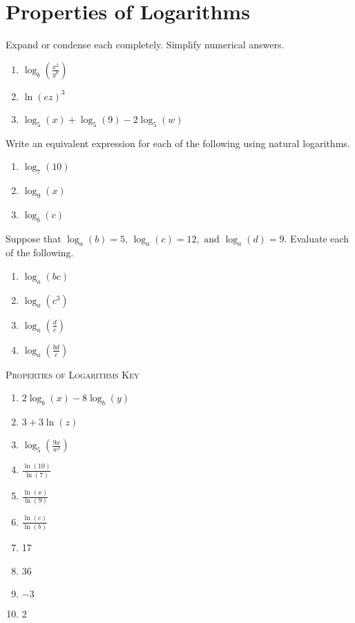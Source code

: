 \chapter{Properties of Logarithms}

Expand or condense each completely. Simplify numerical answers.
\begin{enumerate}
	\item $\log_b\left(\frac{x^2}{y^8}\right)$
	\item $\ln\left(ez\right)^3$
	\item $\log_5(x) + \log_5(9) - 2\log_5(w)$
\setcounter{Review}{\value{enumi}}
\end{enumerate}

Write an equivalent expression for each of the following using natural logarithms.
\begin{enumerate}
\setcounter{enumi}{\value{Review}}
	\item $\log_7(10)$
	\item $\log_9(x)$
	\item $\log_b(c)$
\setcounter{Review}{\value{enumi}}
\end{enumerate}

Suppose that $\log_a(b) = 5, \, \log_a(c) = 12, \text{ and } \log_a(d) = 9$. Evaluate each of the following.
\begin{enumerate}	\setcounter{enumi}{\value{Review}}
	\item $\log_a(bc)$
    \item $\log_a(c^3)$
    \item $\log_a\left(\frac{d}{c}\right)$
    \item $\log_a\left(\frac{bd}{c}\right)$
\end{enumerate}
\setcounter{Review}{\value{enumi}}

\newpage

\textsc{Properties of Logarithms Key}

\begin{enumerate}
	\item $2\log_b(x) - 8\log_b(y)$
    \item $3 + 3\ln(z)$
    \item $\log_5\left(\frac{9x}{w^2}\right)$
    \item $\frac{\ln(10)}{\ln(7)}$
    \item $\frac{\ln(x)}{\ln(9)}$
    \item $\frac{\ln(c)}{\ln(b)}$
    \item 17
    \item 36
    \item $-3$
    \item 2
\end{enumerate}